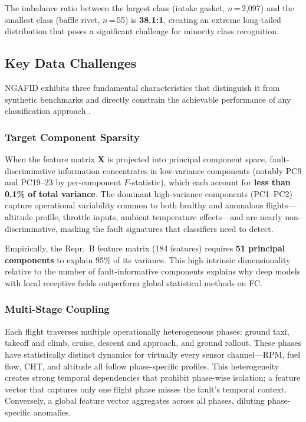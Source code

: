 The imbalance ratio between the largest class (intake gasket, $n$\,=\,2{,}097)
and the smallest class (baffle rivet, $n$\,=\,55) is \textbf{38.1:1}, creating
an extreme long-tailed distribution that poses a significant challenge for
minority class recognition.

\subsection{Key Data Challenges}
\label{subsec:challenges}

NGAFID exhibits three fundamental characteristics that distinguish it from
synthetic benchmarks and directly constrain the achievable performance of any
classification approach \cite{convtok2023, lmsd2025}.

\subsubsection{Target Component Sparsity}

When the feature matrix $\mathbf{X}$ is projected into principal component space,
fault-discriminative information concentrates in low-variance components (notably
PC9 and PC19--23 by per-component $F$-statistic), which each account for
\textbf{less than 0.1\% of total variance}. The dominant high-variance components
(PC1--PC2) capture operational variability common to both healthy and anomalous
flights---altitude profile, throttle inputs, ambient temperature effects---and are
nearly non-discriminative, masking the fault signatures that classifiers need to
detect.

Empirically, the Repr.~B feature matrix (184 features) requires \textbf{51
principal components} to explain 95\% of its variance. This high intrinsic
dimensionality relative to the number of fault-informative components explains
why deep models with local receptive fields outperform global statistical methods
on FC.

\subsubsection{Multi-Stage Coupling}

Each flight traverses multiple operationally heterogeneous phases: ground taxi,
takeoff and climb, cruise, descent and approach, and ground rollout. These phases
have statistically distinct dynamics for virtually every sensor channel---RPM,
fuel flow, CHT, and altitude all follow phase-specific profiles. This
heterogeneity creates strong temporal dependencies that prohibit phase-wise
isolation; a feature vector that captures only one flight phase misses the
fault's temporal context. Conversely, a global feature vector aggregates across
all phases, diluting phase-specific anomalies.

